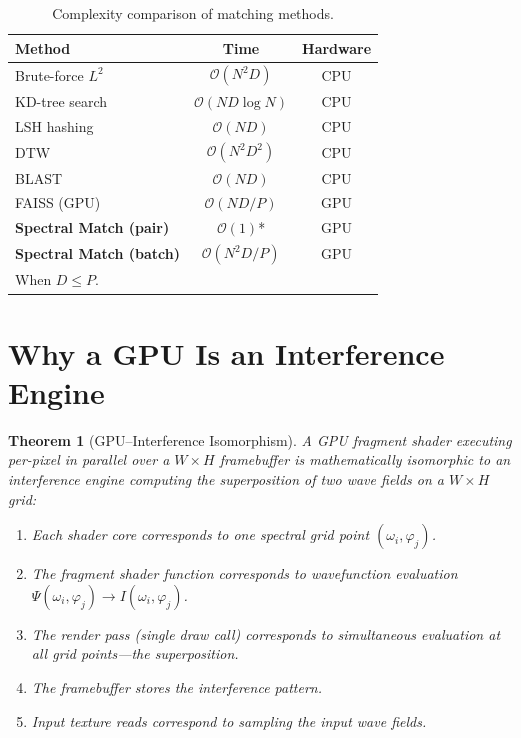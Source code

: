 \documentclass[11pt,twocolumn,a4paper]{article}
\newtheorem{theorem}{Theorem}[section]
\newcommand{\BigO}{\mathcal{O}}
\begin{document}
\begin{table}[t]
\centering
\caption{Complexity comparison of matching methods.}
\label{tab:complexity}
\begin{tabular}{lcc}
\toprule
\textbf{Method} & \textbf{Time} & \textbf{Hardware} \\
\midrule
Brute-force $L^2$ & $\BigO(N^2 D)$ & CPU \\
KD-tree search & $\BigO(ND \log N)$ & CPU \\
LSH hashing \citep{indyk1998} & $\BigO(ND)$ & CPU \\
DTW \citep{sakoe1978} & $\BigO(N^2 D^2)$ & CPU \\
BLAST \citep{altschul1990} & $\BigO(ND)$ & CPU \\
FAISS (GPU) \citep{johnson2019} & $\BigO(ND/P)$ & GPU \\
\textbf{Spectral Match (pair)} & $\BigO(1)$* & GPU \\
\textbf{Spectral Match (batch)} & $\BigO(N^2 D/P)$ & GPU \\
\bottomrule
\multicolumn{3}{l}{\footnotesize *When $D \leq P$.}
\end{tabular}
\end{table}



\section{Why a GPU Is an Interference Engine}
\label{sec:gpu_engine}

\begin{theorem}[GPU--Interference Isomorphism]
\label{thm:gpu_interference}
A GPU fragment shader executing per-pixel in parallel over a
$W \times H$ framebuffer is mathematically isomorphic to an
interference engine computing the superposition of two wave fields
on a $W \times H$ grid:
\begin{enumerate}[label=(\roman*),nosep]
  \item Each shader core corresponds to one spectral grid point
    $(\omega_i, \varphi_j)$.
  \item The fragment shader function corresponds to wavefunction
    evaluation $\Psi(\omega_i, \varphi_j) \to I(\omega_i, \varphi_j)$.
  \item The render pass (single draw call) corresponds to simultaneous
    evaluation at all grid points---the superposition.
  \item The framebuffer stores the interference pattern.
  \item Input texture reads correspond to sampling the input wave fields.
\end{enumerate}
\end{theorem}
\end{document}
